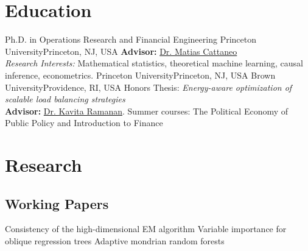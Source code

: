 \documentclass[10pt,a4paper,roman]{moderncv}        %
\begin{document}
\makecvtitle

\vspace{-0.2cm}
\section{Education}
{Ph.D. in Operations Research and Financial Engineering}
{Princeton University}{Princeton, NJ, USA}{}
{\textbf{Advisor: }\color{blue}\href{https://cattaneo.princeton.edu}{Dr. Matias Cattaneo}\color{black}\\
\textit{Research Interests:} Mathematical statistics, theoretical machine learning, causal inference, econometrics.}
{Princeton University}{Princeton, NJ, USA}{}{}
{Brown University}{Providence, RI, USA}{}{ Honors Thesis: \textit{Energy-aware optimization of scalable load balancing
    strategies}
  \\
  \textbf{Advisor: }
  \color{blue}\href{https://www.brown.edu/academics/applied-mathematics/faculty/kavita-ramanan/home}
  {Dr. Kavita Ramanan}\color{black}.}  %
{Summer courses: The Political Economy of Public Policy and Introduction to Finance}

\vspace{-0.2cm}
\section{Research}
\subsection{Working Papers}
{Consistency of the high-dimensional EM algorithm} {}{}{}
{Variable importance for oblique regression trees} {}{}{}
{Adaptive mondrian random forests} {}{}{}
\end{document}
